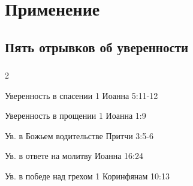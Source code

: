 \documentclass[t,aspectratio=169]{beamer} %
\begin{document}
\section{Применение}
\subsection{Пять отрывков об уверенности}
\begin{frame}[c]
	\frametitle{\insertsection}
	\framesubtitle{\insertsubsection}
	\begin{multicols}{2}
	\begin{exampleblock}{Уверенность в спасении}\setlength{\textwidth}{0.4\textwidth}
		1 Иоанна 5:11-12
	\end{exampleblock}
	\begin{exampleblock}{Уверенность в прощении}
		1 Иоанна 1:9
	\end{exampleblock}
	\begin{exampleblock}{Ув. в Божьем водительстве}
		Притчи 3:5-6
	\end{exampleblock}	
	\begin{exampleblock}{Ув. в ответе на молитву}
		Иоанна 16:24
	\end{exampleblock}	
	\begin{exampleblock}{Ув. в победе над грехом}
		1 Коринфянам 10:13
	\end{exampleblock}

	\end{multicols}		
\end{frame}
\end{document}
